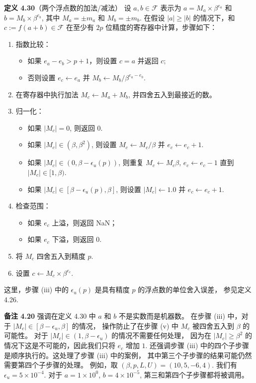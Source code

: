 \documentclass[a4paper]{ctexart}
\begin{document}
{\noindent \textbf{定义 4.30}（两个浮点数的加法/减法） 
设 $a, b \in \mathcal{F}$ 表示为 
$a = M_a \times \beta^{e_a}$ 和 $b = M_b \times \beta^{e_b}$, 
其中 $M_a = \pm m_a$ 和 $M_b = \pm m_b$. 
在假设 $|a| \geq |b|$ 的情况下，和 $c := f(a + b) \in \mathcal{F}$ 
在至少有 $2p$ 位精度的寄存器中计算，步骤如下：
\begin{enumerate}
    \item 指数比较：
    \begin{itemize}
        \item 如果 $e_a - e_b > p + 1$，则设置 $c = a$ 并返回 $c$;
        \item 否则设置 $e_c \leftarrow e_a$ 
        并 $M_b \leftarrow M_b / \beta^{e_a - e_b}$.
    \end{itemize}
    \item 在寄存器中执行加法 $M_c \leftarrow M_a + M_b$, 并四舍五入到最接近的数。
    \item 归一化：
    \begin{itemize}
        \item 如果 $|M_c| = 0$, 则返回 $0$.
        \item 如果 $|M_c| \in (\beta, \beta^2)$, 
        则设置 $M_c \leftarrow M_c / \beta$ 并 $e_c \leftarrow e_c + 1$.
        \item 如果 $|M_c| \in (0, \beta - \epsilon_u(p))$, 
        则重复 $M_c \leftarrow M_c \beta$, 
        $e_c \leftarrow e_c - 1$ 直到 $|M_c| \in [1, \beta)$.
        \item 如果 $|M_c| \in [\beta - \epsilon_u(p), \beta]$, 
        则设置 $|M_c| \leftarrow 1.0$ 并 $e_c \leftarrow e_c + 1$.
    \end{itemize}
    \item 检查范围：
    \begin{itemize}
        \item 如果 $e_c$ 上溢，则返回 NaN；
        \item 如果 $e_c$ 下溢，则返回 $0$.
    \end{itemize}
    \item 将 $M_c$ 四舍五入到精度 $p$.
    \item 设置 $c \leftarrow M_c \times \beta^{e_c}$.
\end{enumerate}

这里，步骤 (iii) 中的 $\epsilon_u(p)$ 是具有精度 $p$ 的浮点数的单位舍入误差，
参见定义 4.26.

\noindent \textbf{备注 4.20 } 
强调在定义 4.30 中 $a$ 和 $b$ 不是实数而是机器数。
在步骤 (iii) 中，对于 $|M_c| \in [\beta - \epsilon_u, \beta]$ 的情况，
操作防止了在步骤 (v) 中 $M_c$ 被四舍五入到 $\beta$ 的可能性。
对于 $|M_c| \in (1, \beta - \epsilon_u)$ 的情况不需要任何处理，
因为在 $|M_c| \geq \beta^2$ 的情况下这是不可能的，因此我们只将 $e_c$ 增加 $1$. 
还强调步骤 (iii) 中的四个子步骤是顺序执行的。这处理了步骤 (iii) 中的案例，
其中第三个子步骤的结果可能仍然需要第四个子步骤的处理。
例如，取 $(\beta, p, L, U) = (10, 5, -6, 4)$. 
我们有 $\epsilon_u = 5 \times 10^{-4}$. 对于 $a = 1 \times 10^0$, 
$b = 4 \times 10^{-5}$, 第三和第四个子步骤都将被调用。

}
\end{document}
